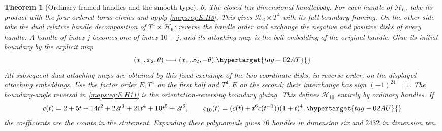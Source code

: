 \documentclass[11pt,a4paper]{article}
\numberwithin{equation}{section}
\newtheorem{theorem}{Theorem}[section]
\theoremstyle{definition}
\begin{document}
\begin{theorem}[Ordinary framed handles and the smooth type]
\emph{6. The closed ten-dimensional handlebody.}
For each handle of $\mathcal H_6$, take its product with the four
ordered torus circles and apply \eqref{maps:eq:E.H8}.  This gives
$\mathcal H_6\times T^4$ with its full boundary framing.  On the
other side take the dual relative handle decomposition of
$T^4\times\mathcal H_6$: reverse the handle order and exchange
the negative and positive disks of every handle.  A handle of
index $j$ becomes one of index $10-j$, and its attaching map is
the belt embedding of the original handle.  Glue its
initial boundary by the explicit map
\begin{equation}
                 (x_1,x_2,\theta)\longmapsto
                                    (x_1,x_2,-\theta).
 \hypertarget{tag-02AT}{}\label{maps:eq:E.H11}
\end{equation}
All subsequent dual attaching maps are obtained by this fixed
exchange of the two coordinate disks, in reverse order, on the
displayed attaching embeddings. Use the factor order $E,T^4$
on the first half and $T^4,E$ on the second; their interchange
has sign $(-1)^{24}=1$.  The boundary-angle reversal in \eqref{maps:eq:E.H11}
is the orientation-reversing boundary gluing.  This defines
$\mathcal H_{10}$ entirely by ordinary handles.  If
\begin{equation}
 c(t)=2+5t+14t^2+22t^3+21t^4+10t^5+2t^6,
 \qquad
       c_{10}(t)=(c(t)+t^6c(t^{-1}))(1+t)^4,
 \hypertarget{tag-02AU}{}\label{maps:eq:E.H12}
\end{equation}
the coefficients are the counts in the statement.  Expanding these polynomials gives $76$ handles in dimension six
and $2432$ in dimension ten.

\end{theorem}
\end{document}
